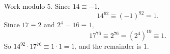 Work modulo $5$. Since $14\equiv-1$,
\[14^{92}\equiv(-1)^{92}=1 .\]
Since $17\equiv2$ and $2^4=16\equiv1$,
\[17^{76}\equiv2^{76}=\left(2^4\right)^{19}\equiv1 .\]
So $14^{92}\cdot17^{76}\equiv1\cdot1=1$, and the remainder is $\boxed{1}$.
